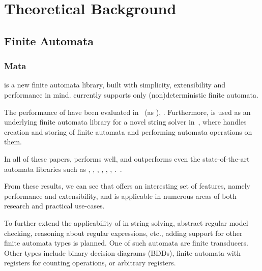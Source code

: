 





\chapter{Theoretical Background}
\section{Finite Automata}
\subsection{Mata}

\mata is a new finite automata library, built with simplicity, extensibility and performance in mind.
\mata currently supports only (non)deterministic finite automata.

The performance of \mata have been evaluated in~\cite{cade23_reasoning_regular_properties_comparision_DBLP:conf/cade/FiedorHHRSV23} (as \enfa), \cite{tacas24_mata_10.1007/978-3-031-57249-4_7}.
Furthermore, \mata is used as an underlying finite automata library for a novel string solver \noodler in~\cite{fm23fm23_equations_synergy_regular_constraints_DBLP:conf/fm/BlahoudekCCHHLS23, oopsla23_stabilization_DBLP:journals/pacmpl/ChenCHHLS23,tacas24_noodler_10.1007/978-3-031-57246-3_2}, where \mata handles creation and storing of finite automata and performing automata operations on them.

In all of these papers, \mata performs well, and outperforms even the state-of-the-art automata libraries such as \automatajar, \awali, \vata, \brics, \automatanet, \automatapy, \fado.~\cite{tacas24_mata_10.1007/978-3-031-57249-4_7}.

From these results, we can see that \mata offers an interesting set of features, namely performance and extensibility, and is applicable in numerous areas of both research and practical use-cases.

To further extend the applicability of \mata in string solving, abstract regular model checking, reasoning about regular expressions, etc., adding support for other finite automata types is planned.
One of such automata are finite transducers.
Other types include binary decision diagrams (BDDs), finite automata with registers for counting operations, or arbitrary registers.



